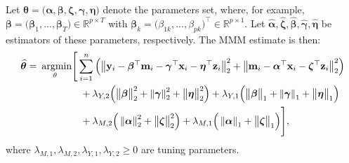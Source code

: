 \documentclass[
  12pt]{article}
\def\R{\mathbb{R}}
\def\M{\mathbf{m}}
\def\X{\mathbf{x}}
\def\Y{\mathbf{y}}
\def\Z{\mathbf{z}}
\begin{document}
Let $\bm{\theta} = \big( \bm{\alpha}, \bm{\beta},  \bm{\zeta}, \bm{\gamma}, \bm{\eta} \big)$ denote the parameters set, where, for example, $\bm{\beta} = \big( \bm{\beta}_{1}, ... , \bm{\beta}_{T} \big) \in \R^{p \times T}$ with $\bm{\beta}_{k} = \big( \beta_{1k}, ..., \beta_{pk} \big)^{\top} \in \R^{p \times 1}$. Let   $\widehat{\bm{\alpha}},   \widehat{\bm{\zeta}},   \widehat{\bm{\beta}},   \widehat{\bm{\gamma}},    \widehat{\bm{\eta}}$ be estimators of these parameters, respectively.
The MMM estimate is then:
\begin{align}
	\widehat{\bm{\theta}}  =  \,  &\underset{\theta}{\textrm{ argmin}}  \Bigg[     \sum_{i=1}^{n} \left(    \left\|  \Y_{i}   -   \bm{\beta}^{\top} \M_{i}   -  \bm{\gamma}^{\top}  \X_{i} -    \bm{\eta}^{\top} \Z_{i}   %
	\right\|_{2}^{2}
	+  \left\|  \M_{i} -     \bm{\alpha}^{\top}\X_{i}    -   \bm{\zeta}^{\top}\Z_{i}  %
	\right\|_{2}^{2}
	\right)
	\label{equa:elastic.net:loss.function}
	\\
	& \hspace{1.5cm} +  \lambda_{Y,2}   \Big(  \big\| \bm{\beta}  \big\|_{2}^{2} + \left\|   \bm{\gamma}   \right\|_{2}^{2}  + \big\|  \bm{\eta}  \big\|_{2}^{2}  \Big)  +    \lambda_{Y,1}   \Big(  \big\| \bm{\beta}  \big\|_{1} + \left\|   \bm{\gamma}  \right\|_{1}  + \big\|   \bm{\eta}  \big\|_{1}  \Big)
	\nonumber
	\\
	& \hspace{1.5cm}  +   \lambda_{M,2}  \Big(  \left\|  \bm{\alpha}  \right\|_{2}^{2} + \big\|  \bm{\zeta}  \big\|_{2}^{2} \Big)  +   \lambda_{M,1}   \Big(  \left\| \bm{\alpha}  \right\|_{1}  + \big\|   \bm{\zeta} \big\|_{1}   \Big)  \Bigg]    ,
	\nonumber
\end{align}
where $\lambda_{M,1} , \lambda_{M,2} ,  \lambda_{Y,1} ,   \lambda_{Y,2} \geq 0$ are tuning parameters.

\end{document}
